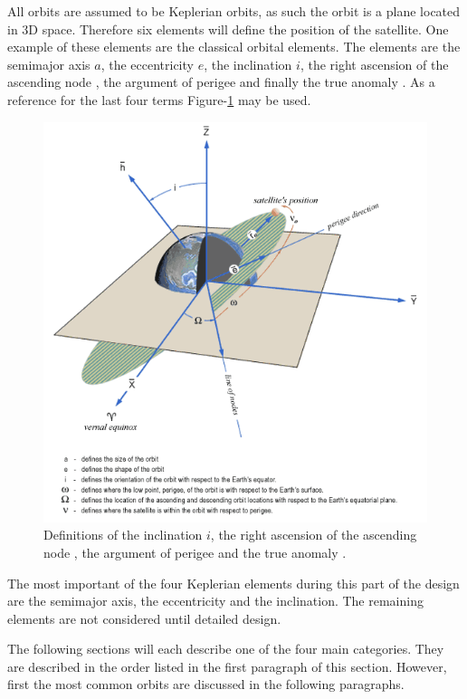 All orbits are assumed to be Keplerian orbits, as such the orbit is a plane located in 3D space. Therefore six elements will define the position of the satellite. One example of these elements are the classical orbital elements. The elements are the semimajor axis $a$, the eccentricity $e$, the inclination $i$, the right ascension of the ascending node \Omega, the argument of perigee \omega and finally the true anomaly \nu. As a reference for the last four terms Figure-\ref{OrbElements} may be used.
\begin{figure} [H]
	\begin{center}
         \includegraphics[width=1.0\textwidth,angle=0]{chapters/img/OrbElements.png}
	\caption{Definitions of the inclination $i$, the right ascension of the ascending node \Omega, the argument of perigee \omega and the true anomaly \nu.}
	\label{OrbElements}
	\end{center}
	\end{figure}
The most important of the four Keplerian elements during this part of the design are the semimajor axis, the eccentricity and the inclination. The remaining elements are not considered until detailed design.

The following sections will each describe one of the four main categories. They are described in the order listed in the first paragraph of this section. However, first the most common orbits are discussed in the following paragraphs.

